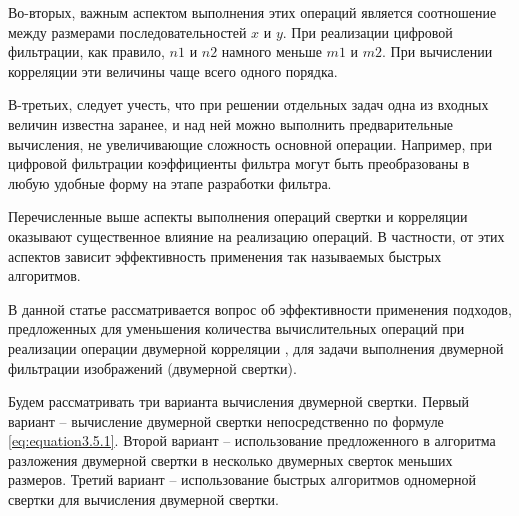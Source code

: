Во-вторых, важным аспектом выполнения этих операций является соотношение между размерами последовательностей $x$ и $y$. При реализации цифровой фильтрации, как правило, $n1$ и $n2$ намного меньше $m1$ и $m2$. При вычислении корреляции эти величины чаще всего одного порядка.

В-третьих, следует учесть, что при решении отдельных задач одна из входных величин известна заранее, и над ней можно выполнить предварительные вычисления, не увеличивающие сложность основной операции.
Например, при цифровой фильтрации коэффициенты фильтра могут быть преобразованы в любую удобные форму на этапе разработки фильтра.

Перечисленные выше аспекты выполнения операций свертки и корреляции оказывают существенное влияние на реализацию операций. В частности, от этих аспектов зависит эффективность применения так называемых быстрых алгоритмов. 

В данной статье \cite{decomposition_method_application2017} рассматривается вопрос об эффективности применения подходов, предложенных для уменьшения количества вычислительных операций при реализации операции двумерной корреляции \cite{550562, altman2015fast}, для задачи выполнения двумерной фильтрации изображений (двумерной свертки).


Будем рассматривать три варианта вычисления двумерной свертки. Первый вариант – вычисление двумерной свертки непосредственно по формуле \ref{eq:equation3.5.1}. Второй вариант – использование предложенного в \cite{550562} алгоритма разложения двумерной свертки в несколько двумерных сверток меньших размеров. Третий вариант – использование быстрых алгоритмов одномерной свертки \cite{MOU1987377} для вычисления двумерной свертки.

